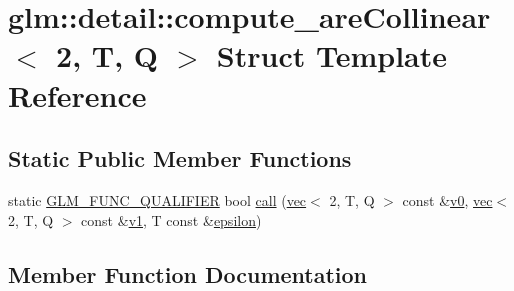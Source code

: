\hypertarget{structglm_1_1detail_1_1compute__are_collinear_3_012_00_01_t_00_01_q_01_4}{}\section{glm\+:\+:detail\+:\+:compute\+\_\+are\+Collinear$<$ 2, T, Q $>$ Struct Template Reference}
\label{structglm_1_1detail_1_1compute__are_collinear_3_012_00_01_t_00_01_q_01_4}
\subsection*{Static Public Member Functions}
\begin{DoxyCompactItemize}
\item 
static \hyperlink{setup_8hpp_a33fdea6f91c5f834105f7415e2a64407}{G\+L\+M\+\_\+\+F\+U\+N\+C\+\_\+\+Q\+U\+A\+L\+I\+F\+I\+ER} bool \hyperlink{structglm_1_1detail_1_1compute__are_collinear_3_012_00_01_t_00_01_q_01_4_a4a32a093975dd49210dafdcb0be3b108}{call} (\hyperlink{structglm_1_1vec}{vec}$<$ 2, T, Q $>$ const \&\hyperlink{_s_d_l__opengl__glext_8h_a7062a23d1d434121d4a88f530703d06a}{v0}, \hyperlink{structglm_1_1vec}{vec}$<$ 2, T, Q $>$ const \&\hyperlink{_s_d_l__opengl__glext_8h_a435c176a02c061b43e19bdf7c86cceae}{v1}, T const \&\hyperlink{group__gtc__constants_ga2a1e57fc5592b69cfae84174cbfc9429}{epsilon})
\end{DoxyCompactItemize}


\subsection{Member Function Documentation}
\mbox{\label{structglm_1_1detail_1_1compute__are_collinear_3_012_00_01_t_00_01_q_01_4_a4a32a093975dd49210dafdcb0be3b108}} 
